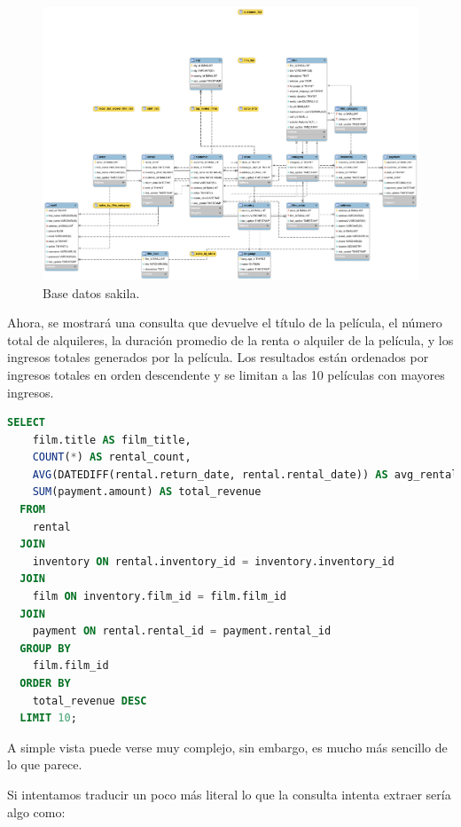 \documentclass[12pt]{article}
\begin{document}
\begin{figure}[h]
  \centering
  \includegraphics[width=1.0\textwidth]{sakila_eer.png} 
  \caption{Base datos sakila.}
  \label{fig:ejemplo}
\end{figure}
\vspace{12pt}

Ahora, se mostrará una consulta que devuelve el título de la película, el número total de alquileres, la duración promedio de la renta o alquiler de la película, y los ingresos totales generados por la película. Los resultados están ordenados por ingresos totales en orden descendente y se limitan a las 10 películas con mayores ingresos.

\begin{lstlisting}[language=SQL]
  SELECT
    film.title AS film_title,
    COUNT(*) AS rental_count,
    AVG(DATEDIFF(rental.return_date, rental.rental_date)) AS avg_rental_duration,
    SUM(payment.amount) AS total_revenue
  FROM
    rental
  JOIN
    inventory ON rental.inventory_id = inventory.inventory_id
  JOIN
    film ON inventory.film_id = film.film_id
  JOIN
    payment ON rental.rental_id = payment.rental_id
  GROUP BY
    film.film_id
  ORDER BY
    total_revenue DESC
  LIMIT 10;

\end{lstlisting}
\vspace{12pt}

A simple vista puede verse muy complejo, sin embargo, es mucho más sencillo de lo que parece.

Si intentamos traducir un poco más literal lo que la consulta intenta extraer sería algo como:
\end{document}
